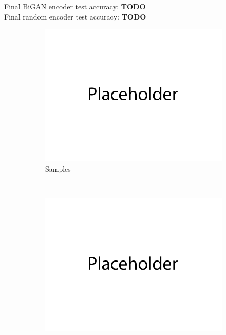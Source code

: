 \documentclass{article}
\begin{document}
\newpage
{}


Final BiGAN encoder test accuracy: \textbf{TODO} \\
Final random encoder test accuracy: \textbf{TODO}
\begin{figure}[H]
    \centering
    \begin{subfigure}{0.5\textwidth}
        \centering
        \includegraphics[width=\textwidth]{figures/q3_samples.png}
        \caption{Samples}
    \end{subfigure}
    \\
    \begin{subfigure}{0.45\textwidth}
        \centering
        \includegraphics[width=\textwidth]{figures/q3_gan_losses.png}

\end{subfigure}
\end{figure}
\end{document}
